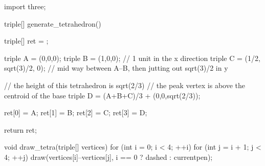 \documentclass[../gatm_answers.tex]{subfiles}
\begin{document}
\begin{asydef}
import three;

triple[] generate_tetrahedron() {
	triple[] ret = {};

	triple A = (0,0,0);
	triple B = (1,0,0); // 1 unit in the x direction
	triple C = (1/2, sqrt(3)/2, 0); // mid way between A--B, then jutting out sqrt(3)/2 in y

	// the height of this tetrahedron is sqrt(2/3)
	// the peak vertex is above the centroid of the base
	triple D = (A+B+C)/3 + (0,0,sqrt(2/3));

	ret[0] = A;
	ret[1] = B;
	ret[2] = C;
	ret[3] = D;

	return ret;
}

void draw_tetra(triple[] vertices) {
	for (int i = 0; i < 4; ++i) {
		for (int j = i + 1; j < 4; ++j) {
			draw(vertices[i]--vertices[j], i == 0 ? dashed : currentpen);
		}
	}
}

\end{asydef}
\end{document}
